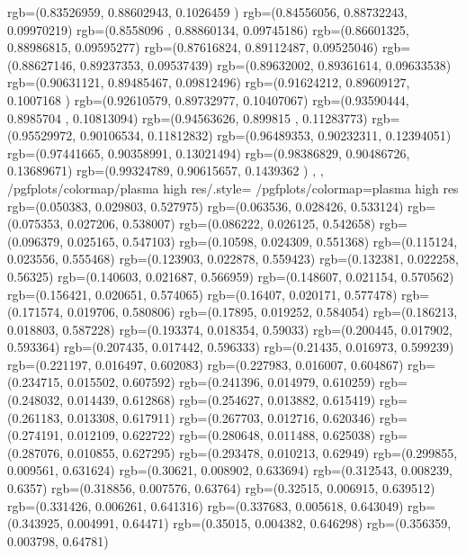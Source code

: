 {{{		  rgb=(0.83526959,  0.88602943,  0.1026459 )
		  rgb=(0.84556056,  0.88732243,  0.09970219)
		  rgb=(0.8558096 ,  0.88860134,  0.09745186)
		  rgb=(0.86601325,  0.88986815,  0.09595277)
		  rgb=(0.87616824,  0.89112487,  0.09525046)
		  rgb=(0.88627146,  0.89237353,  0.09537439)
		  rgb=(0.89632002,  0.89361614,  0.09633538)
		  rgb=(0.90631121,  0.89485467,  0.09812496)
		  rgb=(0.91624212,  0.89609127,  0.1007168 )
		  rgb=(0.92610579,  0.89732977,  0.10407067)
		  rgb=(0.93590444,  0.8985704 ,  0.10813094)
		  rgb=(0.94563626,  0.899815  ,  0.11283773)
		  rgb=(0.95529972,  0.90106534,  0.11812832)
		  rgb=(0.96489353,  0.90232311,  0.12394051)
		  rgb=(0.97441665,  0.90358991,  0.13021494)
		  rgb=(0.98386829,  0.90486726,  0.13689671)
		  rgb=(0.99324789,  0.90615657,  0.1439362 )
		},
	},
	/pgfplots/colormap/plasma high res/.style={%
		/pgfplots/colormap={plasma high res}{%
      rgb=(0.050383, 0.029803, 0.527975)
      rgb=(0.063536, 0.028426, 0.533124)
      rgb=(0.075353, 0.027206, 0.538007)
      rgb=(0.086222, 0.026125, 0.542658)
      rgb=(0.096379, 0.025165, 0.547103)
      rgb=(0.10598, 0.024309, 0.551368)
      rgb=(0.115124, 0.023556, 0.555468)
      rgb=(0.123903, 0.022878, 0.559423)
      rgb=(0.132381, 0.022258, 0.56325)
      rgb=(0.140603, 0.021687, 0.566959)
      rgb=(0.148607, 0.021154, 0.570562)
      rgb=(0.156421, 0.020651, 0.574065)
      rgb=(0.16407, 0.020171, 0.577478)
      rgb=(0.171574, 0.019706, 0.580806)
      rgb=(0.17895, 0.019252, 0.584054)
      rgb=(0.186213, 0.018803, 0.587228)
      rgb=(0.193374, 0.018354, 0.59033)
      rgb=(0.200445, 0.017902, 0.593364)
      rgb=(0.207435, 0.017442, 0.596333)
      rgb=(0.21435, 0.016973, 0.599239)
      rgb=(0.221197, 0.016497, 0.602083)
      rgb=(0.227983, 0.016007, 0.604867)
      rgb=(0.234715, 0.015502, 0.607592)
      rgb=(0.241396, 0.014979, 0.610259)
      rgb=(0.248032, 0.014439, 0.612868)
      rgb=(0.254627, 0.013882, 0.615419)
      rgb=(0.261183, 0.013308, 0.617911)
      rgb=(0.267703, 0.012716, 0.620346)
      rgb=(0.274191, 0.012109, 0.622722)
      rgb=(0.280648, 0.011488, 0.625038)
      rgb=(0.287076, 0.010855, 0.627295)
      rgb=(0.293478, 0.010213, 0.62949)
      rgb=(0.299855, 0.009561, 0.631624)
      rgb=(0.30621, 0.008902, 0.633694)
      rgb=(0.312543, 0.008239, 0.6357)
      rgb=(0.318856, 0.007576, 0.63764)
      rgb=(0.32515, 0.006915, 0.639512)
      rgb=(0.331426, 0.006261, 0.641316)
      rgb=(0.337683, 0.005618, 0.643049)
      rgb=(0.343925, 0.004991, 0.64471)
      rgb=(0.35015, 0.004382, 0.646298)
      rgb=(0.356359, 0.003798, 0.64781)
}}}

